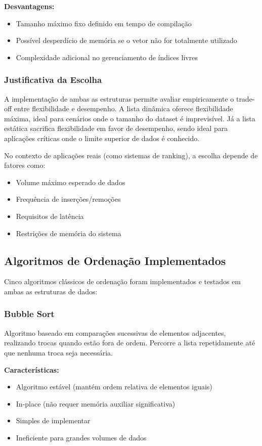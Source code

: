 \documentclass[conference]{IEEEtran}
\begin{document}
\textbf{Desvantagens:}
\begin{itemize}
    \item Tamanho máximo fixo definido em tempo de compilação
    \item Possível desperdício de memória se o vetor não for totalmente utilizado
    \item Complexidade adicional no gerenciamento de índices livres
\end{itemize}

\subsubsection{Justificativa da Escolha}

A implementação de ambas as estruturas permite avaliar empiricamente o trade-off entre flexibilidade e desempenho. A lista dinâmica oferece flexibilidade máxima, ideal para cenários onde o tamanho do dataset é imprevisível. Já a lista estática sacrifica flexibilidade em favor de desempenho, sendo ideal para aplicações críticas onde o limite superior de dados é conhecido.

No contexto de aplicações reais (como sistemas de ranking), a escolha depende de fatores como:
\begin{itemize}
    \item Volume máximo esperado de dados
    \item Frequência de inserções/remoções
    \item Requisitos de latência
    \item Restrições de memória do sistema
\end{itemize}

\subsection{Algoritmos de Ordenação Implementados}

Cinco algoritmos clássicos de ordenação foram implementados e testados em ambas as estruturas de dados:

\subsubsection{Bubble Sort}

Algoritmo baseado em comparações sucessivas de elementos adjacentes, realizando trocas quando estão fora de ordem. Percorre a lista repetidamente até que nenhuma troca seja necessária.

\textbf{Características:}
\begin{itemize}
    \item Algoritmo estável (mantém ordem relativa de elementos iguais)
    \item In-place (não requer memória auxiliar significativa)
    \item Simples de implementar
    \item Ineficiente para grandes volumes de dados
\end{itemize}
\end{document}
